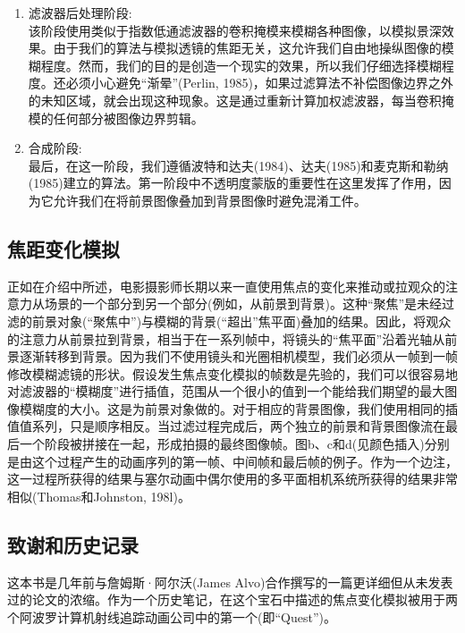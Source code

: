 \begin{CJK}{UTF8}{gbsn}
\begin{enumerate}
	\item 滤波器后处理阶段:\\
	该阶段使用类似于指数低通滤波器的卷积掩模来模糊各种图像，以模拟景深效果。由于我们的算法与模拟透镜的焦距无关，这允许我们自由地操纵图像的模糊程度。然而，我们的目的是创造一个现实的效果，所以我们仔细选择模糊程度。还必须小心避免“渐晕”(Perlin, 1985)，如果过滤算法不补偿图像边界之外的未知区域，就会出现这种现象。这是通过重新计算加权滤波器，每当卷积掩模的任何部分被图像边界剪辑。
	
	\item 合成阶段:\\
	最后，在这一阶段，我们遵循波特和达夫(1984)、达夫(1985)和麦克斯和勒纳(1985)建立的算法。第一阶段中不透明度蒙版的重要性在这里发挥了作用，因为它允许我们在将前景图像叠加到背景图像时避免混淆工件。

\end{enumerate}

\subsection*{焦距变化模拟}
正如在介绍中所述，电影摄影师长期以来一直使用焦点的变化来推动或拉观众的注意力从场景的一个部分到另一个部分(例如，从前景到背景)。这种“聚焦”是未经过滤的前景对象(“聚焦中”)与模糊的背景(“超出”焦平面)叠加的结果。因此，将观众的注意力从前景拉到背景，相当于在一系列帧中，将镜头的“焦平面”沿着光轴从前景逐渐转移到背景。因为我们不使用镜头和光圈相机模型，我们必须从一帧到一帧修改模糊滤镜的形状。假设发生焦点变化模拟的帧数是先验的，我们可以很容易地对滤波器的“模糊度”进行插值，范围从一个很小的值到一个能给我们期望的最大图像模糊度的大小。这是为前景对象做的。对于相应的背景图像，我们使用相同的插值值系列，只是顺序相反。当过滤过程完成后，两个独立的前景和背景图像流在最后一个阶段被拼接在一起，形成拍摄的最终图像帧。图b、c和d(见颜色插入)分别是由这个过程产生的动画序列的第一帧、中间帧和最后帧的例子。作为一个边注，这一过程所获得的结果与塞尔动画中偶尔使用的多平面相机系统所获得的结果非常相似(Thomas和Johnston, 198l)。


\subsection*{致谢和历史记录}
这本书是几年前与詹姆斯·阿尔沃(James Alvo)合作撰写的一篇更详细但从未发表过的论文的浓缩。作为一个历史笔记，在这个宝石中描述的焦点变化模拟被用于两个阿波罗计算机射线追踪动画公司中的第一个(即“Quest”)。

\begin{figure}
\centering
	\hspace{5pt}
	\\
	\hspace{5pt}
\end{figure}


\end{CJK}
